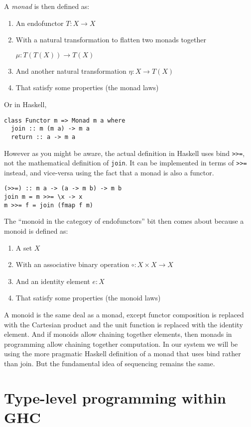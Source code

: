 A \textit{monad} is then defined as:
\begin{enumerate}
\item An endofunctor $T : X \rightarrow X$
\item With a natural transformation to flatten two monads together

${\mu : T(T(X)) \rightarrow T(X)}$
\item And another natural transformation $\eta : X \rightarrow T(X)$
\item That satisfy some properties (the monad laws)
\end{enumerate}

Or in Haskell,
\begin{verbatim}
class Functor m => Monad m a where
  join :: m (m a) -> m a
  return :: a -> m a
\end{verbatim}
However as you might be aware, the actual definition in Haskell uses
bind \texttt{>>=}, not the mathematical definition of
\texttt{join}. It can be implemented in terms of
\texttt{>>=} instead, and vice-versa using the fact that
a monad is also a functor.
\begin{verbatim}
(>>=) :: m a -> (a -> m b) -> m b
join m = m >>= \x -> x
m >>= f = join (fmap f m)
\end{verbatim}

The ``monoid in the category of endofunctors'' bit then comes
about because a monoid is defined as:
\begin{enumerate}
\item A set $X$
\item With an associative binary operation $\circ : X \times X \rightarrow X$
\item And an identity element $e : X$
\item That satisfy some properties (the monoid laws)
\end{enumerate}

A monoid is the same deal as a monad, except functor composition is
replaced with the Cartesian product and the unit function is replaced
with the identity element.  And if monoids allow chaining together
elements, then monads in programming allow chaining together
computation. In our system we will be using the more pragmatic Haskell
definition of a monad that uses bind rather than join. But the
fundamental idea of sequencing remains the same.

\section{Type-level programming within GHC}

